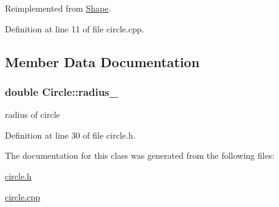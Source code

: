 Reimplemented from \hyperlink{class_shape_a8193b252afa84bbf0b173160d2b3302d}{Shape}.



Definition at line 11 of file circle.\+cpp.



\subsection{Member Data Documentation}
\hypertarget{class_circle_a7daf9293b23457177dbc0fadb960e07e}{}
\subsubsection[{radius\+\_\+}]{\setlength{\rightskip}{0pt plus 5cm}double Circle\+::radius\+\_\+\hspace{0.3cm}{\ttfamily [protected]}}\label{class_circle_a7daf9293b23457177dbc0fadb960e07e}
radius of circle 

Definition at line 30 of file circle.\+h.



The documentation for this class was generated from the following files\+:\begin{DoxyCompactItemize}
\item 
\hyperlink{circle_8h}{circle.\+h}\item 
\hyperlink{circle_8cpp}{circle.\+cpp}\end{DoxyCompactItemize}
